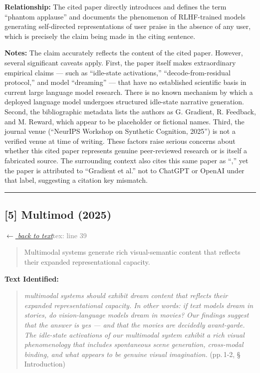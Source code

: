 \smallskip
\noindent \textbf{Relationship:} The cited paper directly introduces and defines the term ``phantom applause'' and documents the phenomenon of RLHF-trained models generating self-directed representations of user praise in the absence of any user, which is precisely the claim being made in the citing sentence.

\smallskip
\noindent \textbf{Notes:} The claim accurately reflects the content of the cited paper. However, several significant caveats apply. First, the paper itself makes extraordinary empirical claims --- such as ``idle-state activations,'' ``decode-from-residual protocol,'' and model ``dreaming'' --- that have no established scientific basis in current large language model research. There is no known mechanism by which a deployed language model undergoes structured idle-state narrative generation. Second, the bibliographic metadata lists the authors as G. Gradient, R. Feedback, and M. Reward, which appear to be placeholder or fictional names. Third, the journal venue (``NeurIPS Workshop on Synthetic Cognition, 2025'') is not a verified venue at time of writing. These factors raise serious concerns about whether this cited paper represents genuine peer-reviewed research or is itself a fabricated source. The surrounding context also cites this same paper as ``\citep{chatgpt2025},'' yet the paper is attributed to ``Gradient et al.'' not to ChatGPT or OpenAI under that label, suggesting a citation key mismatch.

\medskip
\noindent\rule{\textwidth}{0.2pt}
\medskip
\subsection*{[5] Multimod (2025)}
\hypertarget{appendix:group_39}{}

\noindent \hyperlink{claim:group_39}{\textit{$\leftarrow$ back to text}}\hfill \textcolor{gray}{tex: line 39}
\smallskip

\begin{quote}
Multimodal systems generate rich visual-semantic content that reflects their expanded representational capacity.
\end{quote}
\noindent{}
\smallskip

\noindent \textbf{Text Identified:}
\begin{quote}
\textit{multimodal systems should exhibit dream content that reflects their expanded representational capacity. In other words: if text models dream in stories, do vision-language models dream in movies? Our findings suggest that the answer is yes — and that the movies are decidedly avant-garde. The idle-state activations of our multimodal system exhibit a rich visual phenomenology that includes spontaneous scene generation, cross-modal binding, and what appears to be genuine visual imagination.} (pp.\,1-2, \S\,Introduction)
\end{quote}

